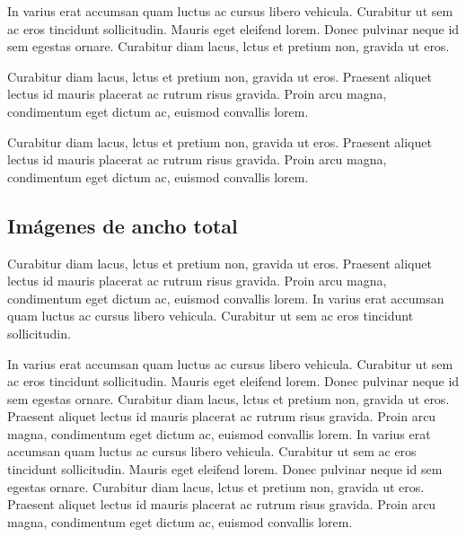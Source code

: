 In varius erat accumsan quam luctus ac cursus libero vehicula. Curabitur ut sem ac eros tincidunt sollicitudin. Mauris eget eleifend lorem. Donec pulvinar neque id sem egestas ornare. Curabitur diam lacus, lctus et pretium non, gravida ut eros. 



Curabitur diam lacus, lctus et pretium non, gravida ut eros. Praesent aliquet lectus id mauris placerat ac rutrum risus gravida. Proin arcu magna, condimentum eget dictum ac, euismod convallis lorem. 


Curabitur diam lacus, lctus et pretium non, gravida ut eros. Praesent aliquet lectus id mauris placerat ac rutrum risus gravida. Proin arcu magna, condimentum eget dictum ac, euismod convallis lorem. 

\subsection{Imágenes de ancho total}

Curabitur diam lacus, lctus et pretium non, gravida ut eros. Praesent aliquet lectus id mauris placerat ac rutrum risus gravida. Proin arcu magna, condimentum eget dictum ac, euismod convallis lorem. In varius erat accumsan quam luctus ac cursus libero vehicula. Curabitur ut sem ac eros tincidunt sollicitudin. 


In varius erat accumsan quam luctus ac cursus libero vehicula. Curabitur ut sem ac eros tincidunt sollicitudin. Mauris eget eleifend lorem. Donec pulvinar neque id sem egestas ornare. Curabitur diam lacus, lctus et pretium non, gravida ut eros. Praesent aliquet lectus id mauris placerat ac rutrum risus gravida. Proin arcu magna, condimentum eget dictum ac, euismod convallis lorem. In varius erat accumsan quam luctus ac cursus libero vehicula. Curabitur ut sem ac eros tincidunt sollicitudin. Mauris eget eleifend lorem. Donec pulvinar neque id sem egestas ornare. Curabitur diam lacus, lctus et pretium non, gravida ut eros. Praesent aliquet lectus id mauris placerat ac rutrum risus gravida. Proin arcu magna, condimentum eget dictum ac, euismod convallis lorem. 

